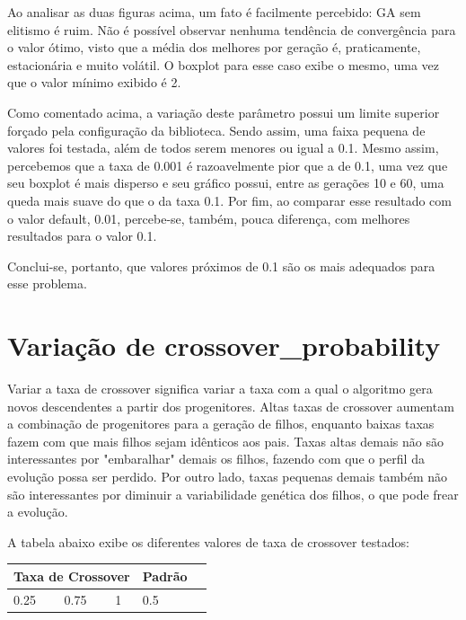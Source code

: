 \documentclass[12pt]{article}
\begin{document}
Ao analisar as duas figuras acima, um fato é facilmente percebido: GA sem elitismo é ruim. Não é possível observar nenhuma tendência de convergência para o valor ótimo, visto que a média dos melhores por geração é, praticamente, estacionária e muito volátil. O boxplot para esse caso exibe o mesmo, uma vez que o valor mínimo exibido é 2. 

Como comentado acima, a variação deste parâmetro possui um limite superior forçado pela configuração da biblioteca. Sendo assim, uma faixa pequena de valores foi testada, além de todos serem menores ou igual a 0.1. Mesmo assim, percebemos que a taxa de 0.001 é razoavelmente pior que a de 0.1, uma vez que seu boxplot é mais disperso e seu gráfico possui, entre as gerações 10 e 60, uma queda mais suave do que o da taxa 0.1. Por fim, ao comparar esse resultado com o valor default, 0.01, percebe-se, também, pouca diferença, com melhores resultados para o valor 0.1.

Conclui-se, portanto, que valores próximos de 0.1 são os mais adequados para esse problema.


\section{Variação de crossover\_probability}

Variar a taxa de crossover significa variar a taxa com a qual o algoritmo gera novos descendentes a partir dos progenitores. Altas taxas de crossover aumentam a combinação de progenitores para a geração de filhos, enquanto baixas taxas fazem com que mais filhos sejam idênticos aos pais. Taxas altas demais não são interessantes por "embaralhar" demais os filhos, fazendo com que o perfil da evolução possa ser perdido. Por outro lado, taxas pequenas demais também não são interessantes por diminuir a variabilidade genética dos filhos, o que pode frear a evolução.

A tabela abaixo exibe os diferentes valores de taxa de crossover testados:

\begin{table}[H]
	\centering
	\begin{tabular}{|l|l|l|l|l|}
		\hline
		\multicolumn{3}{|l|}{Taxa de Crossover} & Padrão \\ \hline
		 0.25    & 0.75    & 1   &0.5 \\ \hline
	\end{tabular}
\end{table}
\end{document}
